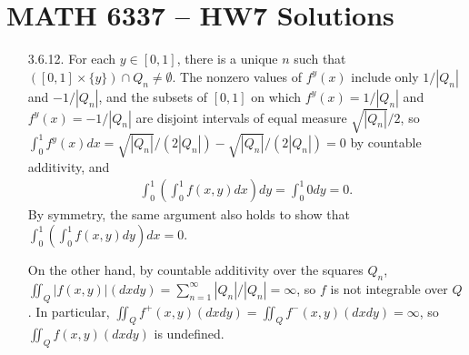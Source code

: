 \documentclass[a4paper,12pt]{article}
\begin{document}
\section*{MATH 6337 -- HW7 Solutions}
\begin{enumerate}
    \item[3.6.12.]
        For each $y \in [0, 1]$, there is a unique $n$ such that $([0, 1] \times \{y\}) \cap Q_n \neq \emptyset$. The nonzero values of $f^y(x)$ include only $1/|Q_n|$ and $-1/|Q_n|$, and the subsets of $[0, 1]$ on which $f^y(x) = 1/|Q_n|$ and $f^y(x) = -1/|Q_n|$ are disjoint intervals of equal measure $\sqrt{|Q_n|}/2$, so $\int_0^1 f^y(x) dx = \sqrt{|Q_n|}/(2|Q_n|) - \sqrt{|Q_n|}/(2|Q_n|) = 0$ by countable additivity, and %
        \begin{align*}
            \int_0^1 \left( \int_0^1 f(x, y) dx \right) dy = \int_0^1 0 dy = 0.
        \end{align*}
        By symmetry, the same argument also holds to show that $\int_0^1 \left( \int_0^1 f(x, y) dy \right) dx = 0$. \par
        On the other hand, by countable additivity over the squares $Q_n$, $\iint_Q |f(x, y)| (dx dy) = \sum_{n = 1}^\infty |Q_n| / |Q_n| = \infty$, so $f$ is not integrable over $Q$. In particular, $\iint_Q f^+(x, y) (dx dy) = \iint_Q f^-(x, y) (dx dy) = \infty$, so $\iint_Q f(x, y) (dx dy)$ is undefined.


\end{enumerate}
\end{document}
